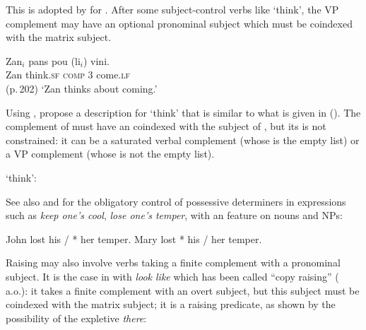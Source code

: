 This is adopted by \citet{HenriandLaurens2011}\addpages for .  After some subject-control verbs
like  `think', the VP complement may have an optional pronominal subject which must be coindexed with the matrix subject. 

\ea
\gll Zan$_{i}$ pans              pou           (li$_{i}$)            vini.\\
     Zan       think.\textsc{sf} \textsc{comp} \hphantom{(}3\SG{} come.\textsc{lf}  \\\hfill(p.\,202)
\glt `Zan thinks about coming.'
\z

Using \xarg, \citet[]{HenriandLaurens2011} propose a description for  `think' that is
similar to what is given in (). The complement of
 must have an \xarg coindexed with the subject of , but its \subjl is not
constrained: it can be a saturated verbal complement (whose \subjv is the empty list) or a VP
complement (whose \subjv is not the empty list).

\ea
\label{ex-pans-Maritian}
 `think':\\
\z

 See also  and  for the obligatory control of possessive determiners in  expressions such as \emph{keep one's cool}, \emph{lose one's temper}, with an \xarg feature on nouns and NPs:
\begin{exe}
\ex \begin{xlist}
\ex John lost his / * her temper.
\ex Mary lost * his / her temper.
\end{xlist}
\end{exe}

Raising may also involve verbs taking a finite complement with a pronominal subject. It is the case in  with \emph{look like} which has been called ``copy raising'' (\citealp{Rogers74a-u,Hornstein99a-u} a.o.): it takes a finite complement with an overt subject, but this subject must be coindexed with the matrix subject; it is a raising predicate, as shown by the possibility of the expletive \emph{there}:

